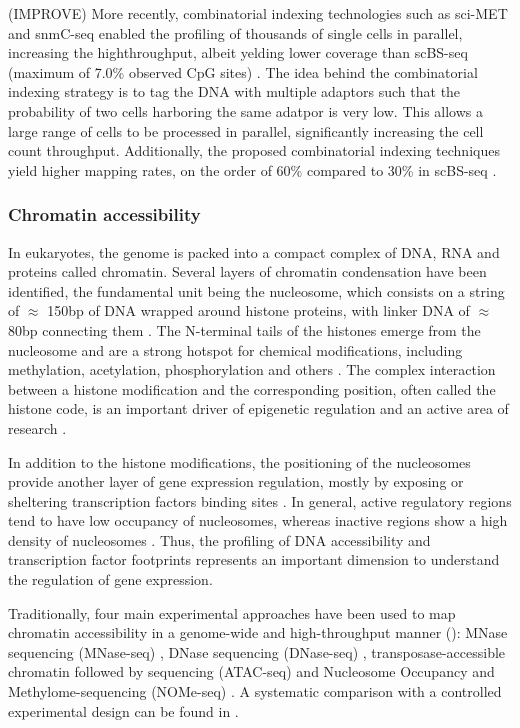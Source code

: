 (IMPROVE) More recently, combinatorial indexing technologies such as sci-MET \cite{Mulqueen2018} and snmC-seq \cite{Luo2018} enabled the profiling of thousands of single cells in parallel, increasing the highthroughput, albeit yelding lower coverage than scBS-seq (maximum of 7.0\% observed CpG sites) \cite{Mulqueen2018}. The idea behind the combinatorial indexing strategy is to tag the DNA with multiple adaptors such that the probability of two cells harboring the same adatpor is very low. This allows a large range of cells to be processed in parallel, significantly increasing the cell count throughput. Additionally, the proposed combinatorial indexing techniques yield higher mapping rates, on the order of 60\% \cite{Mulqueen2018} compared to 30\% in scBS-seq \cite{Smallwood2014}. 

\subsubsection{Chromatin accessibility} \label{section:chromatin_accessibility}
In eukaryotes, the genome is packed into a compact complex of DNA, RNA and proteins called chromatin. Several layers of chromatin condensation have been identified, the fundamental unit being the nucleosome, which consists on a string of $\approx$  150bp of DNA wrapped around histone proteins, with linker DNA of $\approx$  80bp connecting them \cite{Klemm2019,Tsompana2014}. The N-terminal tails of the histones emerge from the nucleosome and are a strong hotspot for chemical modifications, including methylation, acetylation, phosphorylation and others \cite{Bannister2011}. The complex interaction between a histone modification and the corresponding position, often called the histone code, is an important driver of epigenetic regulation and an active area of research \cite{Zhao2015}.

In addition to the histone modifications, the positioning of the nucleosomes provide another layer of gene expression regulation, mostly by exposing or sheltering transcription factors binding sites \cite{Jiang2009}. In general, active regulatory regions tend to have low occupancy of nucleosomes, whereas inactive regions show a high density of nucleosomes \cite{Struhl2013}. Thus, the profiling of DNA accessibility and transcription factor footprints represents an important dimension to understand the regulation of gene expression.

Traditionally, four main experimental approaches have been used to map chromatin accessibility in a genome-wide and high-throughput manner (): MNase sequencing (MNase-seq) \cite{Kaplan2008}, DNase sequencing (DNase-seq) \cite{Song2010}, transposase-accessible chromatin followed by sequencing (ATAC-seq) \cite{Buenrostro2013} and Nucleosome Occupancy and Methylome-sequencing (NOMe-seq) \cite{Kelly2012}. A systematic comparison with a controlled experimental design can be found in \cite{Nordstrom2019}.

